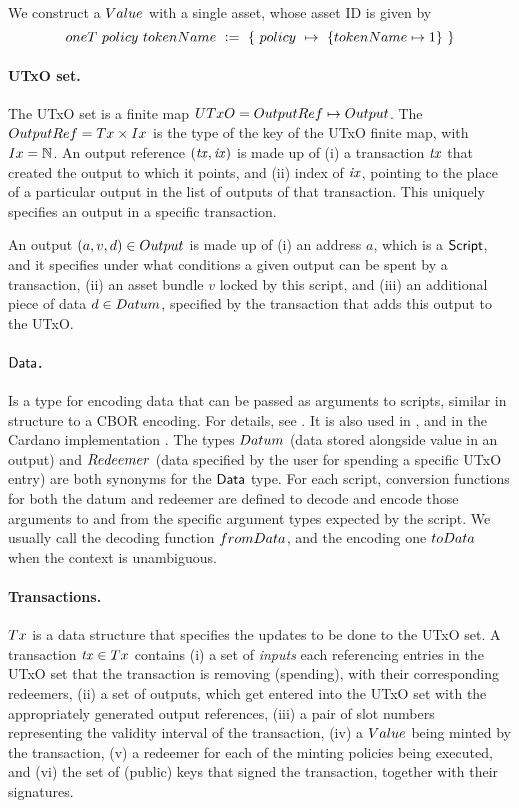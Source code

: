 We construct a $\Value$ with a single asset, whose asset ID is given by
\[ \fun{oneT}~\fun{policy}~\fun{tokenName}~ \leteq~ \{~\fun{policy}~\mapsto~\{ \fun{tokenName} \mapsto 1 \}~\} \]

\paragraph{UTxO set. } The UTxO set
is a finite map $\UTxO = \OutputRef \mapsto \Output$.
The $\OutputRef = \Tx \times \Ix$ is the type of the key of the UTxO finite map, with $\Ix = \N$.
An output reference $(\mathit{tx}, \mathit{ix})$ is made up of (i) a transaction $\mathit{tx}$ that
created the output to which it points, and (ii) index of $\mathit{ix}$,
pointing to the place of a particular output in the list of outputs
of that transaction. This uniquely specifies an
output in a specific transaction.

An output $(a, v, d) \in \Output$ is made up of (i) an address $a$, which is a $\textsf{Script}$,
and it specifies under
what conditions a given output can be spent by a transaction, (ii) an asset bundle $v$ locked
by this script, and (iii) an additional piece of data $d \in \Datum$, specified
by the transaction that adds this output to the UTxO.

\paragraph{$\textsf{Data}$. } Is a type for encoding data that can be passed as arguments
to scripts, similar in structure to a CBOR encoding.
For details, see \cite{agdaspeceutxo}. It is also used in \cite{eutxoma},
and in the Cardano implementation \cite{cardano}.
The types $\Datum$ (data stored alongside value in an output) and
$\Redeemer$ (data specified by the user for spending a specific UTxO entry)
are both synonyms for the $\textsf{Data}$ type. For each script, conversion functions
for both the datum and redeemer are defined to decode and encode those arguments
to and from the specific argument types expected by the script. We usually call the decoding
function $\fun{fromData}$, and the encoding one $\fun{toData}$ when the context
is unambiguous.

\paragraph{Transactions. } $\Tx$ is a data structure that specifies
the updates to be done to the UTxO set. A transaction $\var{tx} \in \Tx$
contains (i) a set of \emph{inputs} each referencing entries in the UTxO set that the transaction
is removing (spending), with their corresponding redeemers, (ii) a set of outputs, which get entered into the
UTxO set with the appropriately generated output references, (iii) a pair of slot
numbers representing the validity interval of the transaction, (iv) a $\Value$ being
minted by the transaction, (v) a redeemer for each
of the minting policies being executed, and (vi) the set of (public) keys that signed the
transaction, together with their signatures.

